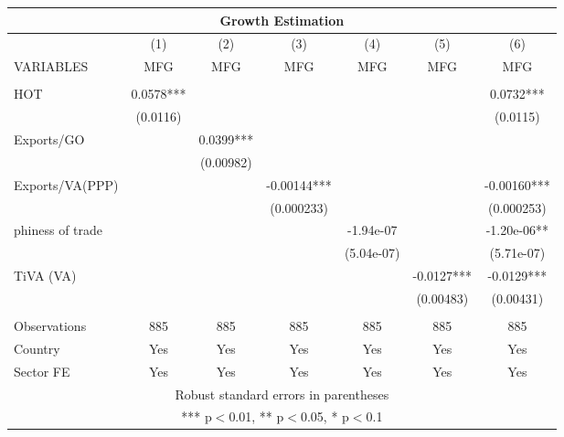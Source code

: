 \documentclass[]{article}
\begin{document}
\begin{tabular}{lcccccc}
\multicolumn{7}{c}{Growth Estimation} \\ \hline
 & (1) & (2) & (3) & (4) & (5) & (6) \\
VARIABLES & MFG & MFG & MFG & MFG & MFG & MFG \\ \hline
 &  &  &  &  &  &  \\
HOT & 0.0578*** &  &  &  &  & 0.0732*** \\
 & (0.0116) &  &  &  &  & (0.0115) \\
Exports/GO &  & 0.0399*** &  &  &  &  \\
 &  & (0.00982) &  &  &  &  \\
Exports/VA(PPP) &  &  & -0.00144*** &  &  & -0.00160*** \\
 &  &  & (0.000233) &  &  & (0.000253) \\
phiness of trade &  &  &  & -1.94e-07 &  & -1.20e-06** \\
 &  &  &  & (5.04e-07) &  & (5.71e-07) \\
TiVA (VA) &  &  &  &  & -0.0127*** & -0.0129*** \\
 &  &  &  &  & (0.00483) & (0.00431) \\
 &  &  &  &  &  &  \\
Observations & 885 & 885 & 885 & 885 & 885 & 885 \\
Country & Yes & Yes & Yes & Yes & Yes & Yes \\
 Sector FE & Yes & Yes & Yes & Yes & Yes & Yes \\ \hline
\multicolumn{7}{c}{ Robust standard errors in parentheses} \\
\multicolumn{7}{c}{ *** p$<$0.01, ** p$<$0.05, * p$<$0.1} \\
\end{tabular}
\end{document}

